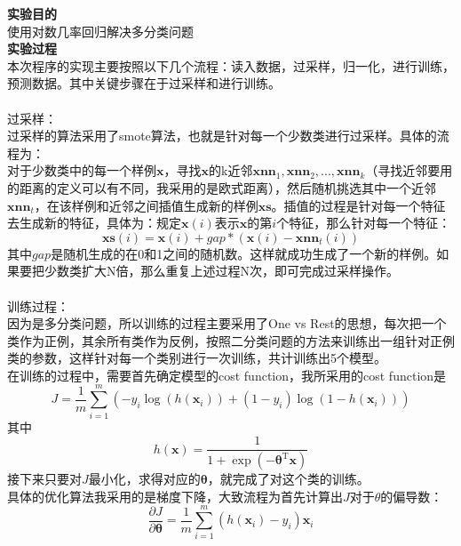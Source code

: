 \documentclass[a4paper,UTF8]{article}
\numberwithin{equation}{section}
\begin{document}
\noindent\textbf{实验目的}\\
使用对数几率回归解决多分类问题\\

\noindent\textbf{实验过程}\\
本次程序的实现主要按照以下几个流程：读入数据，过采样，归一化，进行训练，预测数据。其中关键步骤在于过采样和进行训练。\\\\
过采样：\\
过采样的算法采用了smote算法，也就是针对每一个少数类进行过采样。具体的流程为：\\
对于少数类中的每一个样例$\mathbf{x}$，寻找$\mathbf{x}$的k近邻$\mathbf{xnn}_1,\mathbf{xnn}_2,...,\mathbf{xnn}_k$（寻找近邻要用的距离的定义可以有不同，我采用的是欧式距离），然后随机挑选其中一个近邻$\mathbf{xnn}_t$，在该样例和近邻之间插值生成新的样例$\mathbf{xs}$。插值的过程是针对每一个特征去生成新的特征，具体为：规定$\mathbf{x}(i)$表示$\mathbf{x}$的第$i$个特征，那么针对每一个特征：
\begin{equation}
\mathbf{xs}(i) = \mathbf{x}(i) + gap*(\mathbf{x}(i) - \mathbf{xnn}_t(i))
\end{equation}
其中$gap$是随机生成的在0和1之间的随机数。这样就成功生成了一个新的样例。如果要把少数类扩大N倍，那么重复上述过程N次，即可完成过采样操作。\\\\
训练过程：\\
因为是多分类问题，所以训练的过程主要采用了One vs Rest的思想，每次把一个类作为正例，其余所有类作为反例，按照二分类问题的方法来训练出一组针对正例类的参数，这样针对每一个类别进行一次训练，共计训练出5个模型。\\
在训练的过程中，需要首先确定模型的cost function，我所采用的cost function是
\begin{equation}
J = \frac{1}{m}\sum_{i=1}^{m}(-y_i\log(h(\mathbf{x}_i)) + (1-y_i)\log(1-h(\mathbf{x}_i)))
\end{equation}
其中
\begin{equation}
h(\mathbf{x}) = \frac{1}{1 + \exp(-\boldsymbol{\theta}^\mathrm{T}\mathbf{x})}
\end{equation}
接下来只要对$J$最小化，求得对应的$\boldsymbol{\theta}$，就完成了对这个类的训练。\\
具体的优化算法我采用的是梯度下降，大致流程为首先计算出$J$对于$\theta$的偏导数：
\begin{equation}
\frac{\partial J}{\partial \boldsymbol{\theta}} = \frac{1}{m}\sum_{i=1}^{m}(h(\mathbf{x}_i )- y_i)\mathbf{x}_i
\end{equation}
\end{document}
